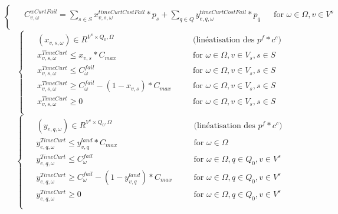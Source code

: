 \documentclass[a4paper,12pt]{article}
\begin{document}
\begin {enumerate}
{\begin{equation}
\begin{cases}
\begin{alignedat}{2}
                & C_{v,\omega}^{wCurtFail} = \sum_{s \in S} x_{v,s, \omega}^{timeCurtCostFail}*p_{s} + \sum_{q \in Q} y_{e,q,\omega}^{timeCurtCostFail} * p_{q} && \text{for } \omega \in\Omega, v \in V^{s}\\
            \end{alignedat}
        \end{cases}
    \end{equation}
    \begin{equation}
        \begin{cases}
            \begin{alignedat}{2}
                & (x_{v,s,\omega}) \in R^{V^{s} \times Q_{0}, \Omega} && \quad \text{(linéatisation des } p^{f}*c^{c} \text{)}\\
                & x_{v,s,\omega}^{TimeCurt} \leq x_{v,s}*C_{max} &&\quad \text{for } \omega \in\Omega, v \in V_{s}, s \in S\\
                & x_{v,s,\omega}^{TimeCurt} \leq C_{\omega}^{fail} &&\quad \text{for } \omega \in\Omega, v \in V_{s}, s \in S\\
                & x_{v,s,\omega}^{TimeCurt} \geq C_{\omega}^{fail}-(1-x_{v,s})*C_{max} &&\quad \text{for } \omega \in\Omega, v \in V_{s}, s \in S\\
                & x_{v,s,\omega}^{TimeCurt} \geq 0 &&\quad \text{for } \omega \in\Omega, v \in V_{s}, s \in S\\
            \end{alignedat}
        \end{cases}
    \end{equation}
    \begin{equation}
        \begin{cases}
            \begin{alignedat}{2}
                & (y_{e,q,\omega}) \in R^{V^{s} \times Q_{0}, \Omega} && \quad \text{(linéatisation des } p^{f}*c^{c} \text{)} \\
                & y_{e,q,\omega}^{TimeCurt} \leq y_{v,q}^{land} * C_{max} &&\quad \text{for } \omega \in \Omega \\
                & y_{e,q,\omega}^{TimeCurt} \leq C_{\omega}^{fail} &&\quad \text{for } \omega \in\Omega, q \in Q_{0}, v \in V^{s}\\
                & y_{e,q,\omega}^{TimeCurt} \geq C_{\omega}^{fail}-(1-y_{v,q}^{land})*C_{max} &&\quad \text{for } \omega \in\Omega, q \in Q_{0}, v \in V^{s}\\
                & y_{e,q,\omega}^{TimeCurt} \geq 0 &&\quad \text{for } \omega \in \Omega, q \in Q_{0}, v \in V^{s}\\

\end{alignedat}
\end{cases}
\end{equation}}
\end{enumerate}
\end{document}
